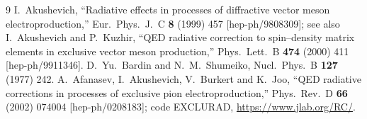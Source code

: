 \documentclass[11pt]{article}
\begin{document}
\begin{thebibliography}{9}
 I.~Akushevich,
``Radiative effects in processes of diffractive vector meson
electroproduction,'' Eur.\ Phys.\ J.\ C \textbf{8} (1999) 457
[hep-ph/9808309]; see also I.~Akushevich and P.~Kuzhir,
``QED radiative correction to spin--density matrix elements in exclusive
vector meson production,'' Phys.\ Lett.\ B \textbf{474} (2000) 411
[hep-ph/9911346].
 D.~Yu.~Bardin and N.~M.~Shumeiko,
Nucl.\ Phys.\ B \textbf{127} (1977) 242.
 A.~Afanasev, I.~Akushevich, V.~Burkert and K.~Joo,
``QED radiative corrections in processes of exclusive pion
electroproduction,'' Phys.\ Rev.\ D \textbf{66} (2002) 074004
[hep-ph/0208183]; code EXCLURAD, \url{https://www.jlab.org/RC/}.
\end{thebibliography}
\end{document}
